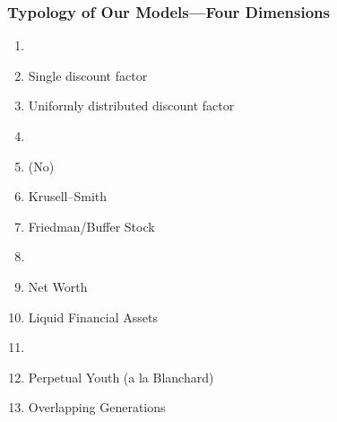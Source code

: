 \begin{frame}
\frametitle{{Typology of Our Models---{Four Dimensions}}}

\begin{block}{}\footnotesize
\begin{enumerate}
\item {}
\bi \scriptsize
\item {} Single discount factor
\item {} Uniformly distributed discount factor
\ei
\item {}
\bi \scriptsize
\item (No)
\item Krusell--Smith
\item Friedman/Buffer Stock
\ei
\item {}
\bi \scriptsize
\item Net Worth
\item Liquid Financial Assets
\ei
\item {}
\bi \scriptsize
\item Perpetual Youth (a la Blanchard)
\item Overlapping Generations
\ei
\end{enumerate}
\end{block}

\end{frame}


